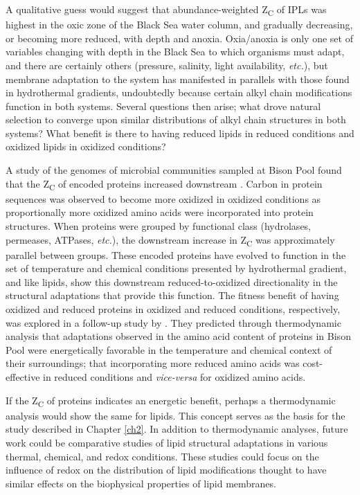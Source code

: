 A qualitative guess would suggest that abundance-weighted Z\textsubscript{C} of IPLs was highest in the oxic zone of the Black Sea water column, and gradually decreasing, or becoming more reduced, with depth and anoxia. Oxia/anoxia is only one set of variables changing with depth in the Black Sea to which organisms must adapt, and there are certainly others (pressure, salinity, light availability, \textit{etc.}), but membrane adaptation to the system has manifested in parallels with those found in hydrothermal gradients, undoubtedly because certain alkyl chain modifications function in both systems. Several questions then arise; what drove natural selection to converge upon similar distributions of alkyl chain structures in both systems? What benefit is there to having reduced lipids in reduced conditions and oxidized lipids in oxidized conditions?

A study of the genomes of microbial communities sampled at Bison Pool found that the Z\textsubscript{C} of encoded proteins increased downstream \citep{dick2011calculation}. Carbon in protein sequences was observed to become more oxidized in oxidized conditions as proportionally more oxidized amino acids were incorporated into protein structures. When proteins were grouped by functional class (hydrolases, permeases, ATPases, \textit{etc.}), the downstream increase in Z\textsubscript{C} was approximately parallel between groups. These encoded proteins have evolved to function in the set of temperature and chemical conditions presented by hydrothermal gradient, and like lipids, show this downstream reduced-to-oxidized directionality in the structural adaptations that provide this function. The fitness benefit of having oxidized and reduced proteins in oxidized and reduced conditions, respectively, was explored in a follow-up study by \cite{dick2013metastable}. They predicted through thermodynamic analysis that adaptations observed in the amino acid content of proteins in Bison Pool were energetically favorable in the temperature and chemical context of their surroundings; that incorporating more reduced amino acids was cost-effective in reduced conditions and \textit{vice-versa} for oxidized amino acids.

If the Z\textsubscript{C} of proteins indicates an energetic benefit, perhaps a thermodynamic analysis would show the same for lipids. This concept serves as the basis for the study described in Chapter \ref{ch2}. In addition to thermodynamic analyses, future work could be comparative studies of lipid structural adaptations in various thermal, chemical, and redox conditions. These studies could focus on the influence of redox on the distribution of lipid modifications thought to have similar effects on the biophysical properties of lipid membranes.

